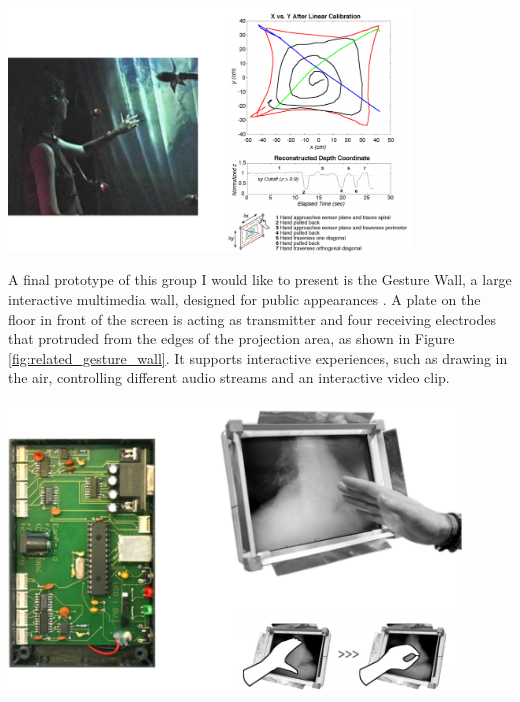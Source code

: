 \begin{minipage}{\linewidth}
\centering
\includegraphics[width=0.8\textwidth]{images/related_gesture_wall}
\label{fig:related_gesture_wall}
\end{minipage}

A final prototype of this group I would like to present is the Gesture Wall, a large interactive multimedia wall, designed for public appearances \cite{smith1998electric}. A plate on the floor in front of the screen is acting as transmitter and four receiving electrodes that protruded from the edges of the projection area, as shown in Figure \ref{fig:related_gesture_wall}. It supports interactive experiences, such as drawing in the air, controlling different audio streams and an interactive video clip.

\begin{minipage}{\linewidth}
\centering
\includegraphics[width=0.9\textwidth]{images/related_ctk_thracker}
\label{fig:related_ctk_thracker}
\end{minipage}

